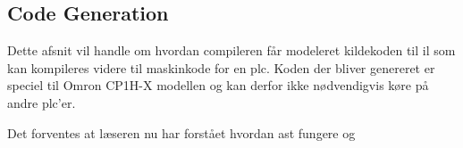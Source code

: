 \subsection{Code Generation}\label{ssec:codegen}
Dette afsnit vil handle om hvordan compileren får modeleret kildekoden til \gls{il} som kan kompileres videre til maskinkode for en \gls{plc}. Koden der bliver genereret er speciel til Omron CP1H-X modellen og kan derfor ikke nødvendigvis køre på andre \gls{plc}'er.

Det forventes at læseren nu har forstået hvordan \gls{ast} fungere og 